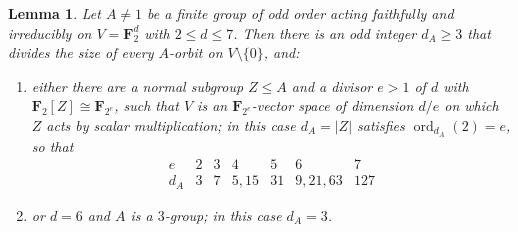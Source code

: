 \documentclass[11pt,a4paper,reqno]{amsart}
\newtheorem{lemma}[theorem]{Lemma}
\theoremstyle{definition}
\theoremstyle{remark}
\newcommand{\F}{\mathbf F}
\begin{document}
\begin{lemma}\label{lem:scalar}
Let $A\neq1$ be a finite group of odd order acting faithfully and
irreducibly on $V=\F_2^d$ with $2\le d\le7$.  Then there is an odd
integer $d_A\ge3$ that divides the size of every $A$-orbit on
$V\setminus\{0\}$, and:
\begin{enumerate}[label=\textup{(\roman*)}]
\item either there are a normal subgroup $Z\le A$ and a divisor $e>1$
 of $d$ with $\F_2[Z]\cong\F_{2^e}$, such that $V$ is an
 $\F_{2^e}$-vector space of dimension $d/e$ on which $Z$ acts by scalar
 multiplication; in this case $d_A=|Z|$ satisfies
 $\operatorname{ord}_{d_A}(2)=e$, so that
\[
 \begin{array}{c|cccccc}
 e&2&3&4&5&6&7\\\hline
 d_A&3&7&5,15&31&9,21,63&127
 \end{array}
\]
\item or $d=6$ and $A$ is a $3$-group; in this case $d_A=3$.
\end{enumerate}
\end{lemma}
\end{document}
